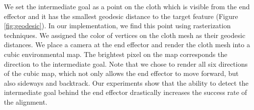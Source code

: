 
We set the intermediate goal as a point on the cloth which is visible from the end effector and it has the smallest geodesic distance to the target feature (Figure \ref{fig:geodesic}). In our implementation, we find this point using rasterization techniques. We assigned the color of vertices on the cloth mesh as their geodesic distances. We place a camera at the end effector and render the cloth mesh into a cubic environmental map. The brightest pixel on the map corresponds the direction to the intermediate goal. Note that we chose to render all six directions of the cubic map, which not only allows the end effector to move forward, but also sideways and backtrack. Our experiments show that the ability to detect the intermediate goal behind the end effector drastically increases the success rate of the alignment.

